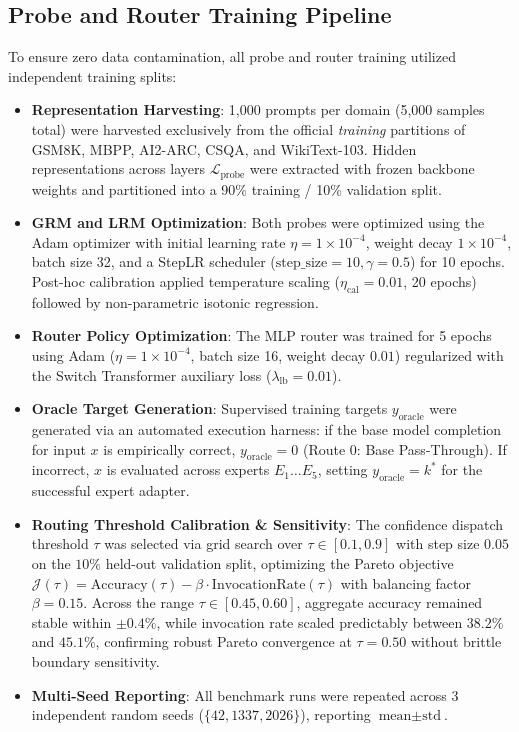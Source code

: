 \documentclass[journal,10pt,twocolumn]{IEEEtran}
\begin{document}
\subsection{Probe and Router Training Pipeline}
\label{sec:training_pipeline}
To ensure zero data contamination, all probe and router training utilized independent training splits:
\begin{itemize}\setlength{\itemsep}{1.5pt}\setlength{\parskip}{0pt}
    \item \textbf{Representation Harvesting}: 1,000 prompts per domain (5,000 samples total) were harvested exclusively from the official \textit{training} partitions of GSM8K, MBPP, AI2-ARC, CSQA, and WikiText-103. Hidden representations across layers $\mathcal{L}_{\text{probe}}$ were extracted with frozen backbone weights and partitioned into a 90\% training / 10\% validation split.
    \item \textbf{GRM and LRM Optimization}: Both probes were optimized using the Adam optimizer with initial learning rate $\eta = 1 \times 10^{-4}$, weight decay $1 \times 10^{-4}$, batch size 32, and a StepLR scheduler ($\text{step\_size} = 10, \gamma = 0.5$) for 10 epochs. Post-hoc calibration applied temperature scaling ($\eta_{\text{cal}} = 0.01$, 20 epochs) followed by non-parametric isotonic regression.
    \item \textbf{Router Policy Optimization}: The MLP router was trained for 5 epochs using Adam ($\eta = 1 \times 10^{-4}$, batch size 16, weight decay $0.01$) regularized with the Switch Transformer auxiliary loss ($\lambda_{\text{lb}} = 0.01$).
    \item \textbf{Oracle Target Generation}: Supervised training targets $y_{\text{oracle}}$ were generated via an automated execution harness: if the base model completion for input $x$ is empirically correct, $y_{\text{oracle}} = 0$ (Route 0: Base Pass-Through). If incorrect, $x$ is evaluated across experts $E_1 \dots E_5$, setting $y_{\text{oracle}} = k^*$ for the successful expert adapter.
    \item \textbf{Routing Threshold Calibration \& Sensitivity}: The confidence dispatch threshold $\tau$ was selected via grid search over $\tau \in [0.1, 0.9]$ with step size $0.05$ on the $10\%$ held-out validation split, optimizing the Pareto objective $\mathcal{J}(\tau) = \text{Accuracy}(\tau) - \beta \cdot \text{InvocationRate}(\tau)$ with balancing factor $\beta = 0.15$. Across the range $\tau \in [0.45, 0.60]$, aggregate accuracy remained stable within $\pm 0.4\%$, while invocation rate scaled predictably between $38.2\%$ and $45.1\%$, confirming robust Pareto convergence at $\tau = 0.50$ without brittle boundary sensitivity.
    \item \textbf{Multi-Seed Reporting}: All benchmark runs were repeated across 3 independent random seeds ($\{42, 1337, 2026\}$), reporting $\text{mean} \pm \text{std}$.
\end{itemize}
\end{document}
